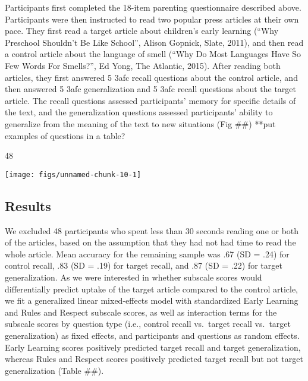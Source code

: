 \documentclass[10pt, letterpaper]{article}
\newenvironment{CodeChunk}{}{}
\begin{document}
Participants first completed the 18-item parenting questionnaire
described above. Participants were then instructed to read two popular
press articles at their own pace. They first read a target article about
children's early learning (``Why Preschool Shouldn't Be Like School'',
Alison Gopnick, Slate, 2011), and then read a control article about the
language of smell (``Why Do Most Languages Have So Few Words For
Smells?'', Ed Yong, The Atlantic, 2015). After reading both articles,
they first answered 5 3afc recall questions about the control article,
and then answered 5 3afc generalization and 5 3afc recall questions
about the target article. The recall questions assessed participants'
memory for specific details of the text, and the generalization
questions assessed participants' ability to generalize from the meaning
of the text to new situations (Fig \#\#) **put examples of questions in
a table?

\begin{CodeChunk}
\begin{CodeOutput}
[1] 48
\end{CodeOutput}
\end{CodeChunk}

\begin{CodeChunk}

\texttt{[image: figs/unnamed-chunk-10-1]} \end{CodeChunk}

\subsection{Results}\label{results}

We excluded 48 participants who spent less than 30 seconds reading one
or both of the articles, based on the assumption that they had not had
time to read the whole article. Mean accuracy for the remaining sample
was .67 (SD = .24) for control recall, .83 (SD = .19) for target recall,
and .87 (SD = .22) for target generalization. As we were interested in
whether subscale scores would differentially predict uptake of the
target article compared to the control article, we fit a generalized
linear mixed-effects model with standardized Early Learning and Rules
and Respect subscale scores, as well as interaction terms for the
subscale scores by question type (i.e., control recall vs.~target recall
vs.~target generalization) as fixed effects, and participants and
questions as random effects. Early Learning scores positively predicted
target recall and target generalization, whereas Rules and Respect
scores positively predicted target recall but not target generalization
(Table \#\#).
\end{document}
